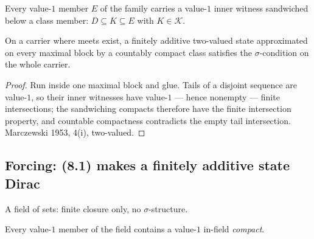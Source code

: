 \begin{definition}
  \label{def:approximates-on}
  \leanok
  Every value-$1$ member $E$ of the family carries a value-$1$ inner witness
  sandwiched below a class member: $D \subseteq K \subseteq E$ with
  $K \in \mathcal{K}$.
\end{definition}

\begin{theorem}
  \label{thm:compact-transport}
  \leanok
  On a carrier where meets exist, a finitely additive two-valued state
  approximated on every maximal block by a countably compact class satisfies the
  $\sigma$-condition on the whole carrier.
\end{theorem}

\begin{proof}
  \leanok
  Run inside one maximal block and glue. Tails of a disjoint sequence are
  value-$1$, so their inner witnesses have value-$1$ --- hence nonempty ---
  finite intersections; the sandwiching compacts therefore have the finite
  intersection property, and countable compactness contradicts the empty tail
  intersection. Marczewski 1953, 4(i), two-valued.
\end{proof}

\subsection{Forcing: (8.1) makes a finitely additive state Dirac}

\begin{definition}
  \label{def:set-field}
  \leanok
  A field of sets: finite closure only, no $\sigma$-structure.
\end{definition}

\begin{definition}
  \label{def:inner-regular-81}
  \leanok
  Every value-$1$ member of the field contains a value-$1$ in-field
  \emph{compact}.
\end{definition}

